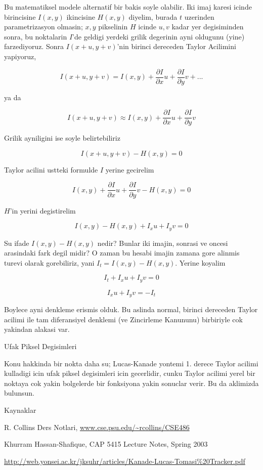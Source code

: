 \documentclass[12pt,fleqn]{article}\usepackage{../common}
\begin{document}
Bu matematiksel modele alternatif bir bakis soyle olabilir. Iki imaj karesi
icinde birincisine $I(x,y)$ ikincisine $H(x,y)$ diyelim, burada $t$
uzerinden parametrizasyon olmasin; $x,y$ pikselinin $H$ icinde $u,v$ kadar
yer degisiminden sonra, bu noktalarin $I$'de geldigi yerdeki grilik degerinin
ayni oldugunu (yine) farzediyoruz. Sonra $I(x+u,y+v)$'nin birinci
dereceden Taylor Acilimini yapiyoruz, 

$$ I(x+u,y+v) = I(x,y) + \frac{\partial I}{\partial x}u + 
\frac{\partial I}{\partial y}v + ...
$$

ya da

$$ I(x+u,y+v) \approx I(x,y) + \frac{\partial I}{\partial x}u + 
\frac{\partial I}{\partial y}v 
$$

Grilik ayniligini ise soyle belirtebiliriz

$$  I(x+u,y+v) - H(x,y) = 0$$

Taylor acilini ustteki formulde $I$ yerine gecirelim

$$ I(x,y) + 
\frac{\partial I}{\partial x}u + 
\frac{\partial I}{\partial y}v - H(x,y) = 0
$$

$H$'in yerini degistirelim

$$ I(x,y)  - H(x,y) + I_xu + I_yv = 0$$

Su ifade $I(x,y) - H(x,y)$ nedir? Bunlar iki imajin, sonrasi ve oncesi
arasindaki fark degil midir?  O zaman bu hesabi imajin zamana gore alinmis
turevi olarak gorebiliriz, yani $I_t = I(x,y) - H(x,y)$. Yerine koyalim

$$ I_t + I_xu + I_yv = 0$$

$$ I_xu + I_yv = -I_t $$

Boylece ayni denkleme erismis olduk. Bu aslinda normal, birinci
dereceden Taylor acilimi ile tam diferansiyel denklemi (ve Zincirleme
Kanununu) birbiriyle cok yakindan alakasi var. 

Ufak Piksel Degisimleri

Konu hakkinda bir nokta daha su; Lucas-Kanade yontemi 1. derece Taylor
acilimi kulladigi icin ufak piksel degisimleri icin gecerlidir, cunku
Taylor acilimi yerel bir noktaya cok yakin bolgelerde bir fonksiyona
yakin sonuclar verir. Bu da aklimizda bulunsun.

Kaynaklar

R. Collins Ders Notlari, \url{www.cse.psu.edu/~rcollins/CSE486}

Khurram Hassan-Shafique, CAP 5415 Lecture Notes, Spring 2003

\url{http://web.yonsei.ac.kr/jksuhr/articles/Kanade-Lucas-Tomasi\%20Tracker.pdf}
\end{document}
